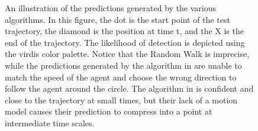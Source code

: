 \documentclass[usenames,dvipsnames]{article}
\begin{document}
\begin{enumerate}
\begin{item}
\begin{figure}[t!]
\begin{subfigure}[t]{0.5\textwidth}
	\label{fig:death}
	\end{subfigure}
	\caption{An illustration of the predictions generated by the various algorithms. In this figure, the dot is the start point of the test trajectory, the diamond is the position at time t, and the X is the end of the trajectory. The likelihood of detection is depicted using the virdis color palette. Notice that the Random Walk is imprecise, while the predictions generated by the algorithm in \cite{Kitani2012} are unable to match the speed of the agent and choose the wrong direction to follow the agent around the circle. The algorithm in \cite{Alahi2016} is confident and close to the trajectory at small times, but their lack of a motion model causes their prediction to compress into a point at intermediate time scales.}
	\reversemarginpar {}
\end{figure}

\end{item}

\end{enumerate}
\end{document}
